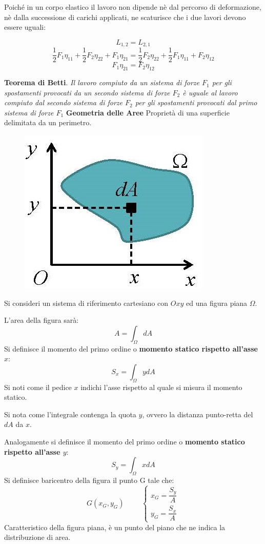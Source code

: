 \documentclass{article}
\begin{document}
\begin{adjustwidth}{2in}{}
	Poiché in un corpo elastico il lavoro non dipende nè dal percorso
	di deformazione, nè dalla successione di carichi applicati, ne scaturisce che i due lavori devono essere uguali:
	
	\[ L_{1,2} = L_{2,1} \]
	\[ \dfrac{1}{2}F_1\eta_{11} + \dfrac{1}{2}F_2\eta_{22} +F_1\eta_{21} = \dfrac{1}{2}F_2\eta_{22} + \dfrac{1}{2}F_1\eta_{11} + F_2\eta_{12} \]
	\[ F_1\eta_{21} = F_2\eta_{12}  \]
	
	\textbf{Teorema di Betti}. \textit{Il lavoro compiuto da un sistema di forze $ F_1 $
		per gli spostamenti provocati da un secondo sistema di forze $ F_2 $
		è uguale al lavoro compiuto dal secondo sistema di forze $ F_2 $ per
		gli spostamenti provocati dal primo sistema di forze $ F_1 $} \newline 
	\newpage
{\Large \textbf{Geometria delle Aree}} \mbox{} \newline
Proprietà di una superficie delimitata da un perimetro.
\begin{figure}[H]
	\centering
	\includegraphics[width=0.25\linewidth]{immagini/1.PARTE7_Pagina_67}
\end{figure}
	Si consideri un sistema di riferimento cartesiano con $ Oxy $ ed una
	figura piana $ \Omega $. \newline

	L'area della figura sarà:
	\[
	A=\int_{\Omega} dA
	\]
	Si definisce il momento del primo ordine o \textbf{momento statico rispetto all'asse $ x $}: 
	\[
	S_x=\int_{\Omega} ydA
	\]
	Si noti come il pedice $x$ indichi l'asse rispetto al quale si misura il momento statico. \newline
	
	Si nota come l'integrale contenga la quota $y$, ovvero la distanza punto-retta del $dA$ da $x$. \newline 
	
	Analogamente si definisce il momento del primo ordine o  \textbf{momento statico rispetto all'asse $ y $}:
	\[
	S_y=\int_{\Omega} xdA
	\]
	Si definisce baricentro della figura il punto G tale che: 
	\[
	G(x_G, y_G) \hspace{1cm} \begin{cases}
								x_G = \dfrac{S_y}{A} \\
								y_G = \dfrac{S_x}{A}
	\end{cases}
	\]
	Caratteristico della figura piana, è un punto del piano che ne indica la distribuzione di area. \newline 
	

\end{adjustwidth}
\end{document}
